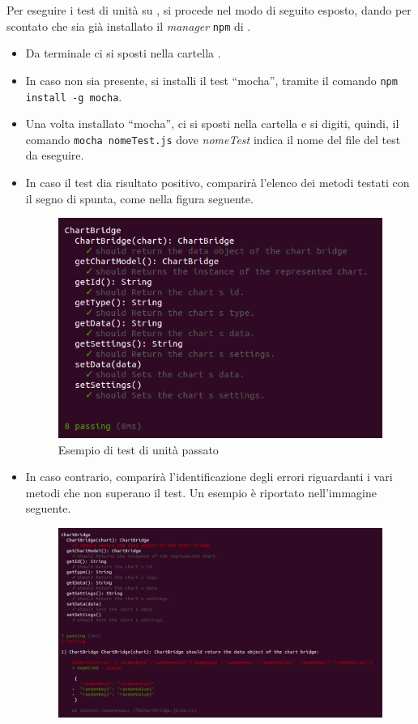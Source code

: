 					Per eseguire i test di unità su , si procede nel modo di seguito esposto, dando per scontato che sia già installato il \textit{ manager} \texttt{npm} di .
					\begin{itemize}
						\item Da terminale ci si sposti nella cartella .
						\item In caso non sia presente, si installi il test  “mocha”, tramite il comando \texttt{npm install -g mocha}. 
						\item Una volta installato “mocha”, ci si sposti nella cartella  e si digiti, quindi, il comando \texttt{mocha nomeTest.js} dove \textit{nomeTest} indica il nome del file del test da eseguire. 
						\item In caso il test dia risultato positivo, comparirà l'elenco dei metodi testati con il segno di spunta, come nella figura seguente.
						\begin{figure}[H]
							\centering
							\includegraphics[scale=0.5]{Pics/TUpassing.png}
							\caption{Esempio di test di unità passato}
						\end{figure}
						\item In caso contrario, comparirà l'identificazione degli errori riguardanti i vari metodi che non superano il test. Un esempio è riportato nell'immagine seguente.
						\begin{figure}[H]
							\centering
							\includegraphics[scale=0.4]{Pics/TUnotPassing.png}

\end{figure}
\end{itemize}

